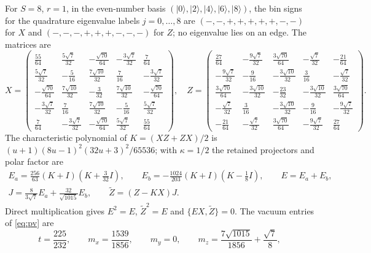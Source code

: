 \documentclass[11pt,a4paper]{article}
\newcommand{\ket}[1]{|#1\rangle}
\newcommand{\Zt}{\widetilde Z}
\begin{document}
For $S=8$, $r=1$, in the even-number basis $(\ket0,\ket2,\ket4,\ket6,\ket8)$, the bin signs for the quadrature eigenvalue labels $j=0,\dots,8$ are $(-,-,+,+,+,+,+,-,-)$ for $X$ and $(-,-,-,+,+,+,-,-,-)$ for $Z$; no eigenvalue lies on an edge. The matrices are
\begin{equation}
X=\begin{pmatrix}
\frac{55}{64}&\frac{5\sqrt7}{32}&-\frac{\sqrt{70}}{64}&-\frac{3\sqrt7}{32}&\frac7{64}\\[2pt]
\frac{5\sqrt7}{32}&-\frac5{16}&\frac{7\sqrt{10}}{32}&\frac7{16}&-\frac{3\sqrt7}{32}\\[2pt]
-\frac{\sqrt{70}}{64}&\frac{7\sqrt{10}}{32}&-\frac3{32}&\frac{7\sqrt{10}}{32}&-\frac{\sqrt{70}}{64}\\[2pt]
-\frac{3\sqrt7}{32}&\frac7{16}&\frac{7\sqrt{10}}{32}&-\frac5{16}&\frac{5\sqrt7}{32}\\[2pt]
\frac7{64}&-\frac{3\sqrt7}{32}&-\frac{\sqrt{70}}{64}&\frac{5\sqrt7}{32}&\frac{55}{64}
\end{pmatrix},\quad
Z=\begin{pmatrix}
\frac{27}{64}&-\frac{9\sqrt7}{32}&\frac{3\sqrt{70}}{64}&-\frac{\sqrt7}{32}&-\frac{21}{64}\\[2pt]
-\frac{9\sqrt7}{32}&-\frac9{16}&-\frac{3\sqrt{10}}{32}&\frac3{16}&-\frac{\sqrt7}{32}\\[2pt]
\frac{3\sqrt{70}}{64}&-\frac{3\sqrt{10}}{32}&-\frac{23}{32}&-\frac{3\sqrt{10}}{32}&\frac{3\sqrt{70}}{64}\\[2pt]
-\frac{\sqrt7}{32}&\frac3{16}&-\frac{3\sqrt{10}}{32}&-\frac9{16}&-\frac{9\sqrt7}{32}\\[2pt]
-\frac{21}{64}&-\frac{\sqrt7}{32}&\frac{3\sqrt{70}}{64}&-\frac{9\sqrt7}{32}&\frac{27}{64}
\end{pmatrix}.
\end{equation}
The characteristic polynomial of $K=(XZ+ZX)/2$ is $(u+1)(8u-1)^2(32u+3)^2/65536$; with $\kappa=1/2$ the retained projectors and polar factor are
\begin{equation}
\begin{gathered}
E_a=\tfrac{256}{63}(K+I)(K+\tfrac{3}{32}I),\qquad E_b=-\tfrac{1024}{203}(K+I)(K-\tfrac18I),\qquad E=E_a+E_b,\\
J=\tfrac{8}{3\sqrt7}E_a+\tfrac{32}{\sqrt{1015}}E_b,\qquad \Zt=(Z-KX)J .
\end{gathered}
\end{equation}
Direct multiplication gives $E^2=E$, $\Zt^2=E$ and $\{EX,\Zt\}=0$. The vacuum entries of \eqref{eq:pv} are
\begin{equation}
t=\frac{225}{232},\qquad m_x=\frac{1539}{1856},\qquad m_y=0,\qquad m_z=\frac{7\sqrt{1015}}{1856}+\frac{\sqrt7}{8},
\end{equation}
\end{document}
